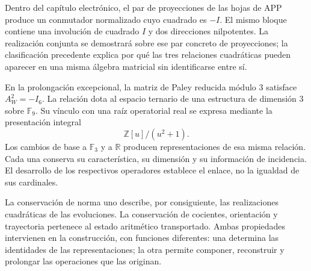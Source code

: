 Dentro del capítulo electrónico, el par de proyecciones de las hojas de APP
produce un conmutador normalizado cuyo cuadrado es \(-I\). El mismo bloque
contiene una involución de cuadrado \(I\) y dos direcciones nilpotentes. La
realización conjunta se demostrará sobre ese par concreto de proyecciones;
la clasificación precedente explica por qué las tres relaciones cuadráticas
pueden aparecer en una misma álgebra matricial sin identificarse entre sí.

En la prolongación excepcional, la matriz de Paley reducida módulo \(3\)
satisface \(A_W^2=-I_6\). La relación dota al espacio ternario de una
estructura de dimensión \(3\) sobre \(\mathbb F_9\). Su vínculo con una raíz
operatorial real se expresa mediante la presentación integral
\[
 \mathbb Z[u]/(u^2+1).
\]
Los cambios de base a \(\mathbb F_3\) y a \(\mathbb R\) producen
representaciones de esa misma relación. Cada una conserva su característica,
su dimensión y su información de incidencia. El desarrollo de los
respectivos operadores establece el enlace, no la igualdad de sus
cardinales.

La conservación de norma uno describe, por consiguiente, las realizaciones
cuadráticas de las evoluciones. La conservación de cocientes, orientación y
trayectoria pertenece al estado aritmético transportado. Ambas propiedades
intervienen en la construcción, con funciones diferentes: una determina las
identidades de las representaciones; la otra permite componer, reconstruir y
prolongar las operaciones que las originan.




